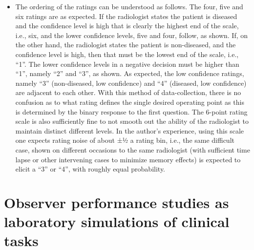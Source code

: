 \documentclass[
]{book}
\providecommand{\tightlist}{%
  \setlength{\itemsep}{0pt}\setlength{\parskip}{0pt}}
\begin{document}
\begin{itemize}
\tightlist
\item
  The ordering of the ratings can be understood as follows. The four, five and six ratings are as expected. If the radiologist states the patient is diseased and the confidence level is high that is clearly the highest end of the scale, i.e., six, and the lower confidence levels, five and four, follow, as shown. If, on the other hand, the radiologist states the patient is non-diseased, and the confidence level is high, then that must be the lowest end of the scale, i.e., ``1''. The lower confidence levels in a negative decision must be higher than ``1'', namely ``2'' and ``3'', as shown. As expected, the low confidence ratings, namely ``3'' (non-diseased, low confidence) and ``4'' (diseased, low confidence) are adjacent to each other. With this method of data-collection, there is no confusion as to what rating defines the single desired operating point as this is determined by the binary response to the first question. The 6-point rating scale is also sufficiently fine to not smooth out the ability of the radiologist to maintain distinct different levels. In the author's experience, using this scale one expects rating noise of about ±½ a rating bin, i.e., the same difficult case, shown on different occasions to the same radiologist (with sufficient time lapse or other intervening cases to minimize memory effects) is expected to elicit a ``3'' or ``4'', with roughly equal probability.
\end{itemize}

\hypertarget{observer-performance-studies-as-laboratory-simulations-of-clinical-tasks}{%
\section{Observer performance studies as laboratory simulations of clinical tasks}\label{observer-performance-studies-as-laboratory-simulations-of-clinical-tasks}}
\end{document}
